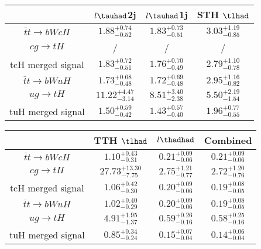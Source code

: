 \centering
\begin{tabular}{|c|c|c|c|} \hline
 & $l\tauhad$2j & $l\tauhad$1j & STH $\tlhad$\\\hline
$\bar{t}t\to bWcH$ & $1.88^{+0.74}_{-0.52}$ & $1.83^{+0.73}_{-0.51}$ & $3.03^{+1.19}_{-0.85}$\\\hline
$cg\to tH$ &  / &  / &  /\\\hline
tcH merged signal & $1.83^{+0.72}_{-0.51}$ & $1.76^{+0.70}_{-0.49}$ & $2.79^{+1.10}_{-0.78}$\\\hline
$\bar{t}t\to bWuH$ & $1.73^{+0.68}_{-0.48}$ & $1.72^{+0.69}_{-0.48}$ & $2.95^{+1.16}_{-0.82}$\\\hline
$ug\to tH$ & $11.22^{+4.47}_{-3.14}$ & $8.51^{+3.40}_{-2.38}$ & $5.50^{+2.19}_{-1.54}$\\\hline
tuH merged signal & $1.50^{+0.59}_{-0.42}$ & $1.43^{+0.57}_{-0.40}$ & $1.96^{+0.77}_{-0.55}$\\\hline
\end{tabular}
\begin{tabular}{|c|c|c|c|} \hline
 & TTH $\tlhad$ & $l\thadhad$ & Combined\\\hline
$\bar{t}t\to bWcH$ & $1.10^{+0.43}_{-0.31}$ & $0.21^{+0.09}_{-0.06}$ & $0.21^{+0.09}_{-0.06}$\\\hline
$cg\to tH$ & $27.73^{+13.30}_{-7.75}$ & $2.75^{+1.21}_{-0.77}$ & $2.72^{+1.20}_{-0.76}$\\\hline
tcH merged signal & $1.06^{+0.42}_{-0.30}$ & $0.20^{+0.09}_{-0.06}$ & $0.19^{+0.08}_{-0.05}$\\\hline
$\bar{t}t\to bWuH$ & $1.02^{+0.40}_{-0.29}$ & $0.20^{+0.09}_{-0.06}$ & $0.19^{+0.08}_{-0.05}$\\\hline
$ug\to tH$ & $4.91^{+1.95}_{-1.37}$ & $0.59^{+0.26}_{-0.16}$ & $0.58^{+0.25}_{-0.16}$\\\hline
tuH merged signal & $0.85^{+0.34}_{-0.24}$ & $0.15^{+0.07}_{-0.04}$ & $0.14^{+0.06}_{-0.04}$\\\hline
\end{tabular}
